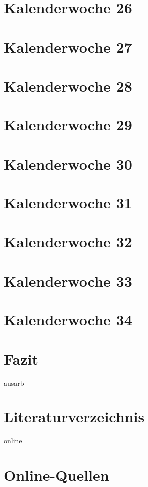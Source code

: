 \documentclass[11pt]{article} %
\begin{document}
\section{Kalenderwoche 26} \label{sec:kw2}
\section{Kalenderwoche 27} \label{sec:kw2}
\section{Kalenderwoche 28} \label{sec:kw2}
\section{Kalenderwoche 29} \label{sec:kw2}
\section{Kalenderwoche 30} \label{sec:kw3}
\section{Kalenderwoche 31} \label{sec:kw3}
\section{Kalenderwoche 32} \label{sec:kw3}
\section{Kalenderwoche 33} \label{sec:kw3}
\section{Kalenderwoche 34} \label{sec:kw3}
\section{Fazit} \label{sec:faz}

\newpage


\newpage

\listoffigures %
\listoftables %
%
\begin{btSect}{ausarb}
\section*{Literaturverzeichnis}
\btPrintCited
\end{btSect}
\begin{btSect}{online}
\section*{Online-Quellen}
\btPrintCited
\end{btSect}
\end{document}
